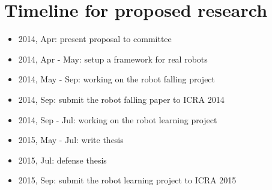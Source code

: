 \chapter{Timeline for proposed research}

\begin{itemize}
  \item 2014, Apr: present proposal to committee
  \item 2014, Apr - May: setup a framework for real robots
  \item 2014, May - Sep: working on the robot falling project
  \item 2014, Sep: submit the robot falling paper to ICRA 2014
  \item 2014, Sep - Jul: working on the robot learning project
  \item 2015, May - Jul: write thesis
  \item 2015, Jul: defense thesis
  \item 2015, Sep: submit the robot learning project to ICRA 2015
\end{itemize}
